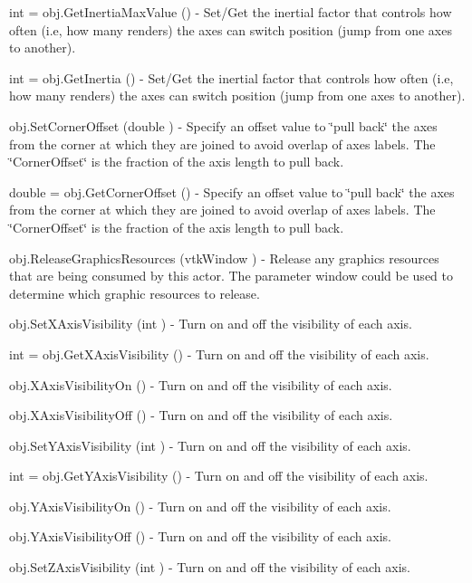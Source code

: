 \begin{DoxyItemize}
\item {\ttfamily int = obj.\-Get\-Inertia\-Max\-Value ()} -\/ Set/\-Get the inertial factor that controls how often (i.\-e, how many renders) the axes can switch position (jump from one axes to another).  
\item {\ttfamily int = obj.\-Get\-Inertia ()} -\/ Set/\-Get the inertial factor that controls how often (i.\-e, how many renders) the axes can switch position (jump from one axes to another).  
\item {\ttfamily obj.\-Set\-Corner\-Offset (double )} -\/ Specify an offset value to \char`\"{}pull back\char`\"{} the axes from the corner at which they are joined to avoid overlap of axes labels. The \char`\"{}\-Corner\-Offset\char`\"{} is the fraction of the axis length to pull back.  
\item {\ttfamily double = obj.\-Get\-Corner\-Offset ()} -\/ Specify an offset value to \char`\"{}pull back\char`\"{} the axes from the corner at which they are joined to avoid overlap of axes labels. The \char`\"{}\-Corner\-Offset\char`\"{} is the fraction of the axis length to pull back.  
\item {\ttfamily obj.\-Release\-Graphics\-Resources (vtk\-Window )} -\/ Release any graphics resources that are being consumed by this actor. The parameter window could be used to determine which graphic resources to release.  
\item {\ttfamily obj.\-Set\-X\-Axis\-Visibility (int )} -\/ Turn on and off the visibility of each axis.  
\item {\ttfamily int = obj.\-Get\-X\-Axis\-Visibility ()} -\/ Turn on and off the visibility of each axis.  
\item {\ttfamily obj.\-X\-Axis\-Visibility\-On ()} -\/ Turn on and off the visibility of each axis.  
\item {\ttfamily obj.\-X\-Axis\-Visibility\-Off ()} -\/ Turn on and off the visibility of each axis.  
\item {\ttfamily obj.\-Set\-Y\-Axis\-Visibility (int )} -\/ Turn on and off the visibility of each axis.  
\item {\ttfamily int = obj.\-Get\-Y\-Axis\-Visibility ()} -\/ Turn on and off the visibility of each axis.  
\item {\ttfamily obj.\-Y\-Axis\-Visibility\-On ()} -\/ Turn on and off the visibility of each axis.  
\item {\ttfamily obj.\-Y\-Axis\-Visibility\-Off ()} -\/ Turn on and off the visibility of each axis.  
\item {\ttfamily obj.\-Set\-Z\-Axis\-Visibility (int )} -\/ Turn on and off the visibility of each axis.  

\end{DoxyItemize}

